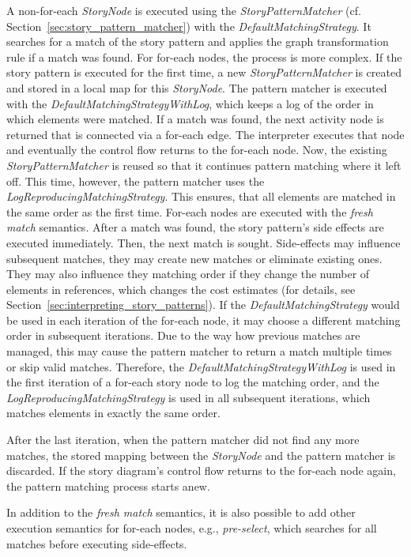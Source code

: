 A non-for-each \emph{StoryNode} is executed using the \emph{StoryPatternMatcher} (cf. Section~\ref{sec:story_pattern_matcher}) with the \emph{DefaultMatchingStrategy}. 
It searches for a match of the story pattern and applies the graph transformation rule if a match was found. 
For for-each nodes, the process is more complex. 
If the story pattern is executed for the first time, a new \emph{StoryPatternMatcher} is created and stored in a local map for this \emph{StoryNode}. 
The pattern matcher is executed with the \emph{DefaultMatchingStrategyWithLog}, which keeps a log of the order in which elements were matched. 
If a match was found, the next activity node is returned that is connected via a for-each edge. 
The interpreter executes that node and eventually the control flow returns to the for-each node.
Now, the existing \emph{StoryPatternMatcher} is reused so that it continues pattern matching where it left off. 
This time, however, the pattern matcher uses the \emph{LogReproducingMatchingStrategy}. 
This ensures, that all elements are matched in the same order as the first time. 
For-each nodes are executed with the \emph{fresh match} semantics. 
After a match was found, the story pattern's side effects are executed immediately. 
Then, the next match is sought. 
Side-effects may influence subsequent matches, they may create new matches or eliminate existing ones. 
They may also influence they matching order if they change the number of elements in references, which changes the cost estimates (for details, see Section~\ref{sec:interpreting_story_patterns}). 
If the \emph{DefaultMatchingStrategy} would be used in each iteration of the for-each node, it may choose a different matching order in subsequent iterations. 
Due to the way how previous matches are managed, this may cause the pattern matcher to return a match multiple times or skip valid matches.
Therefore, the \emph{DefaultMatchingStrategyWithLog} is used in the first iteration of a for-each story node to log the matching order, and the \emph{LogReproducingMatchingStrategy} is used in all subsequent iterations, which matches elements in exactly the same order.

After the last iteration, when the pattern matcher did not find any more matches, the stored mapping between the \emph{StoryNode} and the pattern matcher is discarded. 
If the story diagram's control flow returns to the for-each node again, the pattern matching process starts anew.

In addition to the \emph{fresh match} semantics, it is also possible to add other execution semantics for for-each nodes, e.g., \emph{pre-select}, which searches for all matches before executing side-effects.


